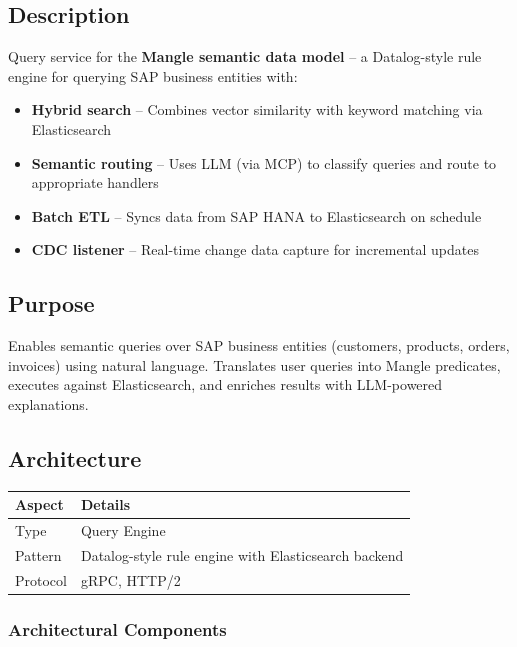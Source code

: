 \documentclass[11pt,a4paper]{article}
\begin{document}
\subsection{Description}

Query service for the \textbf{Mangle semantic data model} -- a Datalog-style rule engine for querying SAP business entities with:

\begin{itemize}[noitemsep]
    \item \textbf{Hybrid search} -- Combines vector similarity with keyword matching via Elasticsearch
    \item \textbf{Semantic routing} -- Uses LLM (via MCP) to classify queries and route to appropriate handlers
    \item \textbf{Batch ETL} -- Syncs data from SAP HANA to Elasticsearch on schedule
    \item \textbf{CDC listener} -- Real-time change data capture for incremental updates
\end{itemize}

\subsection{Purpose}

Enables semantic queries over SAP business entities (customers, products, orders, invoices) using natural language. Translates user queries into Mangle predicates, executes against Elasticsearch, and enriches results with LLM-powered explanations.

\subsection{Architecture}

\begin{tabular}{@{}L{4cm}L{10cm}@{}}
\toprule
\textbf{Aspect} & \textbf{Details} \\
\midrule
Type & Query Engine \\
Pattern & Datalog-style rule engine with Elasticsearch backend \\
Protocol & gRPC, HTTP/2 \\
\bottomrule
\end{tabular}

\subsubsection{Architectural Components}
\end{document}
